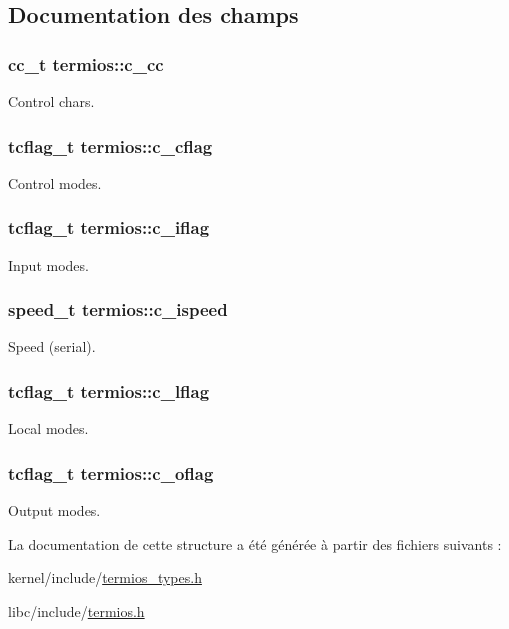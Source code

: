 \subsection{Documentation des champs}
\hypertarget{structtermios_a6058cfc222551ee750c72142299acb2e}{
\subsubsection[{c\-\_\-cc}]{\setlength{\rightskip}{0pt plus 5cm}cc\-\_\-t termios\-::c\-\_\-cc}}\label{structtermios_a6058cfc222551ee750c72142299acb2e}
Control chars. \hypertarget{structtermios_a5d42b95faa4745c3bea53652d2812162}{
\subsubsection[{c\-\_\-cflag}]{\setlength{\rightskip}{0pt plus 5cm}tcflag\-\_\-t termios\-::c\-\_\-cflag}}\label{structtermios_a5d42b95faa4745c3bea53652d2812162}
Control modes. \hypertarget{structtermios_a85b6c86d2a3db45a3829488190e357e4}{
\subsubsection[{c\-\_\-iflag}]{\setlength{\rightskip}{0pt plus 5cm}tcflag\-\_\-t termios\-::c\-\_\-iflag}}\label{structtermios_a85b6c86d2a3db45a3829488190e357e4}
Input modes. \hypertarget{structtermios_a02ae972cbc9fb2cf4a1aa6a6751a421a}{
\subsubsection[{c\-\_\-ispeed}]{\setlength{\rightskip}{0pt plus 5cm}speed\-\_\-t termios\-::c\-\_\-ispeed}}\label{structtermios_a02ae972cbc9fb2cf4a1aa6a6751a421a}
Speed (serial). \hypertarget{structtermios_a91bdd7691180800fccc4b791466ee9c3}{
\subsubsection[{c\-\_\-lflag}]{\setlength{\rightskip}{0pt plus 5cm}tcflag\-\_\-t termios\-::c\-\_\-lflag}}\label{structtermios_a91bdd7691180800fccc4b791466ee9c3}
Local modes. \hypertarget{structtermios_ad6e2cfedb81530e5a6a3a0e30b8c6362}{
\subsubsection[{c\-\_\-oflag}]{\setlength{\rightskip}{0pt plus 5cm}tcflag\-\_\-t termios\-::c\-\_\-oflag}}\label{structtermios_ad6e2cfedb81530e5a6a3a0e30b8c6362}
Output modes. 

La documentation de cette structure a été générée à partir des fichiers suivants \-:\begin{DoxyCompactItemize}
\item 
kernel/include/\hyperlink{termios__types_8h}{termios\-\_\-types.\-h}\item 
libc/include/\hyperlink{termios_8h}{termios.\-h}\end{DoxyCompactItemize}
